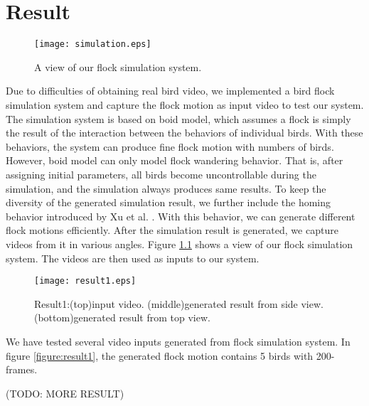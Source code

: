 \chapter{Result}


\begin{figure}[h]
 \begin{center}
  \texttt{[image: simulation.eps]}
 \end{center}
 \caption{A view of our flock simulation system.}
 \label{figure:simulation}
\end{figure}


Due to difficulties of obtaining real bird video, we implemented a bird flock simulation system and capture the flock motion as input video to test our system. The simulation system is based on boid model, which assumes a flock is simply the result of the interaction between the behaviors of individual birds. With these behaviors, the system can produce fine flock motion with numbers of birds. However, boid model can only model flock wandering behavior. That is, after assigning initial parameters, all birds become uncontrollable during the simulation, and the simulation always produces same results. To keep the diversity of the generated simulation result, we further include the homing behavior introduced by Xu et al. \cite{Shape,OB1}. With this behavior, we can generate different flock motions efficiently. After the simulation result is generated, we capture videos from it in various angles. Figure \ref{figure:simulation} shows a view of our flock simulation system. The videos are then used as inputs to our system.


\begin{figure}[h]
 \begin{center}
  \texttt{[image: result1.eps]}
 \end{center}
 \caption{Result1:(top)input video. (middle)generated result from side view. (bottom)generated result from top view.}
 \label{figure:result1_side}
\end{figure}


We have tested several video inputs generated from flock simulation system. In figure \ref{figure:result1}, the generated flock motion contains 5 birds with 200-frames.


(TODO: MORE RESULT)
